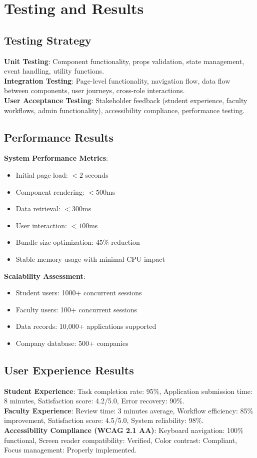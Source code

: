 \documentclass[conference]{IEEEtran}
\begin{document}
\section{Testing and Results}
\subsection{Testing Strategy}
\textbf{Unit Testing}: Component functionality, props validation, state management, event handling, utility functions.\\
\textbf{Integration Testing}: Page-level functionality, navigation flow, data flow between components, user journeys, cross-role interactions.\\
\textbf{User Acceptance Testing}: Stakeholder feedback (student experience, faculty workflows, admin functionality), accessibility compliance, performance testing.

\subsection{Performance Results}
\textbf{System Performance Metrics}:
\begin{itemize}
  \item Initial page load: $<2$ seconds
  \item Component rendering: $<500$ms
  \item Data retrieval: $<300$ms
  \item User interaction: $<100$ms
  \item Bundle size optimization: 45\% reduction
  \item Stable memory usage with minimal CPU impact
\end{itemize}

\textbf{Scalability Assessment}:
\begin{itemize}
  \item Student users: 1000+ concurrent sessions
  \item Faculty users: 100+ concurrent sessions
  \item Data records: 10,000+ applications supported
  \item Company database: 500+ companies
\end{itemize}

\subsection{User Experience Results}
\textbf{Student Experience}: Task completion rate: 95\%, Application submission time: 8 minutes, Satisfaction score: 4.2/5.0, Error recovery: 90\%.\\
\textbf{Faculty Experience}: Review time: 3 minutes average, Workflow efficiency: 85\% improvement, Satisfaction score: 4.5/5.0, System reliability: 98\%.\\
\textbf{Accessibility Compliance (WCAG 2.1 AA)}: Keyboard navigation: 100\% functional, Screen reader compatibility: Verified, Color contrast: Compliant, Focus management: Properly implemented.
\end{document}
